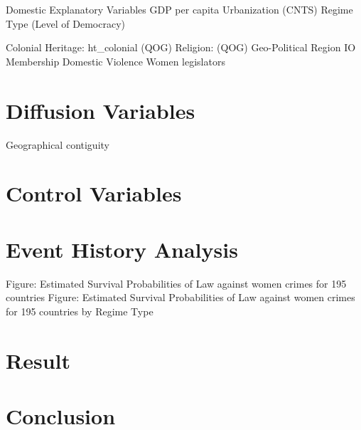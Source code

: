 \documentclass[]{article}
\begin{document}
Domestic Explanatory Variables GDP per capita Urbanization (CNTS) Regime
Type (Level of Democracy)

Colonial Heritage: ht\_colonial (QOG) Religion: (QOG) Geo-Political
Region IO Membership Domestic Violence Women legislators

\section{Diffusion Variables}\label{diffusion-variables}

Geographical contiguity

\section{Control Variables}\label{control-variables}

\section{Event History Analysis}\label{event-history-analysis}

Figure: Estimated Survival Probabilities of Law against women crimes for
195 countries Figure: Estimated Survival Probabilities of Law against
women crimes for 195 countries by Regime Type

\section{Result}\label{result}

\section{Conclusion}\label{conclusion}
\end{document}
